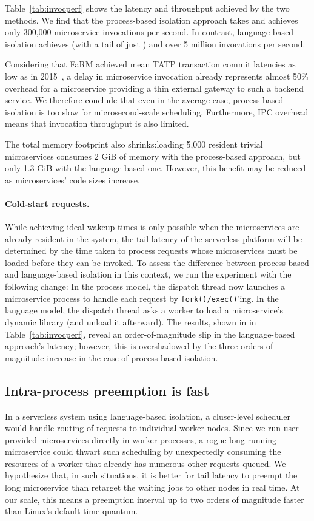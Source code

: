 Table~\ref{tab:invocperf} shows the latency and throughput achieved by the two
methods.  We find that the process-based isolation approach takes  and achieves
only 300,000 microservice invocations per second. In contrast, language-based
isolation achieves  (with a tail of just ) and over 5 million
invocations per second.

Considering that FaRM achieved mean TATP transaction commit latencies as low as
 in 2015~\cite{Dragojevic:sosp2015}, a  delay in microservice invocation
already represents almost 50\% overhead for a microservice providing a thin external
gateway to such a backend service.  We therefore conclude that even in the average
case, process-based isolation is too slow for microsecond-scale scheduling.
Furthermore, IPC overhead means that invocation throughput is also limited.

The total memory footprint also shrinks:\@ loading 5,000 resident
trivial microservices consumes 2 GiB of memory with the process-based approach, but
only 1.3 GiB with the language-based one.  However, this benefit may be reduced as
microservices' code sizes increase.

\paragraph{Cold-start requests.}
While achieving ideal wakeup times is only possible when the microservices are
already resident in the system, the tail latency of the serverless platform will be
determined by the time taken to process requests whose microservices must be loaded
before they can be invoked.  To assess the difference between process-based and
language-based isolation in this context, we run the experiment with the following
change:  In the process model, the dispatch thread now launches a microservice
process to handle each request by \texttt{fork()/exec()}'ing.  In the language model,
the dispatch thread asks a worker to load a microservice's dynamic library (and
unload it afterward).  The results, shown in in Table~\ref{tab:invocperf}, reveal an
order-of-magnitude slip in the language-based approach's latency; however, this is
overshadowed by the three orders of magnitude increase in the case of process-based
isolation.

\subsection{Intra-process preemption is fast}
In a serverless system using language-based isolation, a cluser-level scheduler would
handle routing of requests to individual worker nodes.  Since we run user-provided
microservices directly in worker processes, a rogue long-running microservice could
thwart such scheduling by unexpectedly consuming the resources of a worker that
already has numerous other requests queued.  We hypothesize that, in such situations,
it is better for tail latency to preempt the long microservice than retarget the
waiting jobs to other nodes in real time.  At our scale, this means a preemption
interval up to two orders of magnitude faster than Linux's default  time
quantum.

